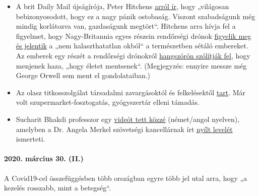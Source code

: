 \begin{itemize}
{  izlandi vizsgálat} megerősíti, hogy az összes pozitív teszteredményt
  mutató személy 50 százaléka „semmiféle tünetet`` nem mutat. A Covid19
  halálozási aránya az izlandi adatok szerint is ezrelékes nagyságrendű,
  azaz megegyezik az influenzáéval vagy az alatt van. A pozitív
  teszteredményt mutató két elhunytból az egyik ráadásul „szokatlan
  tüneteket produkáló turista`` volt``.
  (\href{https://www.covid.is/data}{izlandi adatok})
\item
  A brit Daily Mail újságírója, Peter Hitchens
  \href{https://hitchensblog.mailonsunday.co.uk/2020/03/theres-powerful-evidence-this-great-panic-is-foolish-yet-our-freedom-is-still-broken-and-our-economy.html}{arról
  ír}, hogy „világosan bebizonyosodott, hogy ez a nagy pánik ostobaság.
  Viszont szabadságunk még mindig korlátozva van, gazdaságunk megtört``.
  Hitchens arra hívja fel a figyelmet, hogy Nagy-Britannia egyes részein
  rendőrségi drónok
  \href{https://www.youtube.com/watch?v=fHNxDzLsPeg}{figyelik meg és
  jelentik} a „nem halaszthatatlan okból`` a természetben sétáló
  embereket. Az emberek egy részét a rendőrségi drónokról
  \href{https://www.youtube.com/watch?v=D4GEZjUTkqc}{hangszórón
  szólítják fel}, hogy menjenek haza, „hogy életet mentsenek``.
  (Megjegyzés: ennyire messze még George Orwell sem ment el
  gondolataiban.)
\item
  Az olasz titkosszolgálat társadalmi zavargásoktól és felkelésektől
  \href{https://www.focus.de/panorama/welt/sorge-vor-sozialen-unruhen-supermaerkte-gepluendert-apotheken-ueberfallen-italiens-geheimdienst-warnt-vor-aufstaenden_id_11826664.html}{tart}.
  Már volt szupermarket-fosztogatás, gyógyszertár elleni támadás.
\item
  Sucharit Bhakdi professzor egy
  \href{https://www.youtube.com/watch?v=LsExPrHCHbw\&feature=emb_title}{videót
  tett közzé} (német/angol nyelven), amelyben a Dr. Angela Merkel
  szövetségi kancellárnak írt
  \href{https://swprs.org/offener-brief-von-professor-sucharit-bhakdi-an-bundeskanzlerin-dr-angela-merkel/}{nyílt
  levelét} ismerteti.
\end{itemize}

\hypertarget{2020-muxe1rcius-30-ii}{%
\paragraph{2020. március 30. (II.)}\label{2020-muxe1rcius-30-ii}}

A Covid19-cel összefüggésben több országban egyre több jel utal arra,
hogy „a kezelés rosszabb, mint a betegség``.

